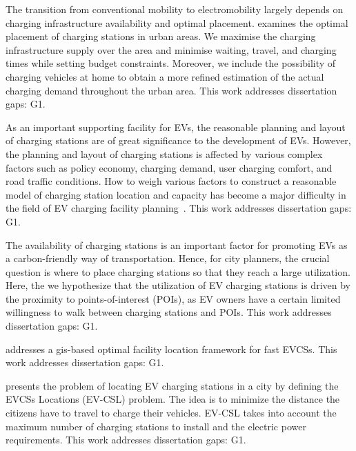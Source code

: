 \documentclass[letterpaper, 12pt, oneside, doublespacing]{Thesis}
\begin{document}
\noindent The transition from conventional mobility to electromobility largely depends on charging infrastructure availability and optimal placement.\cite{reinforcement_learning-based_2022} examines the optimal placement of charging stations in urban areas. We maximise the charging infrastructure supply over the area and minimise waiting, travel, and charging times while setting budget constraints. Moreover, we include the possibility of charging vehicles at home to obtain a more refined estimation of the actual charging demand throughout the urban area. This work addresses dissertation gaps: G1.



\noindent As an important supporting facility for EVs, the reasonable planning and layout of charging stations are of great significance to the development of EVs. However, the planning and layout of charging stations is affected by various complex factors such as policy economy, charging demand, user charging comfort, and road traffic conditions. How to weigh various factors to construct a reasonable model of charging station location and capacity has become a major difficulty in the field of EV charging facility planning~\cite{research_on_2022}. This work addresses dissertation gaps: G1.



\noindent The availability of charging stations is an important factor for promoting EVs as a carbon-friendly way of transportation. Hence, for city planners, the crucial question is where to place charging stations so that they reach a large utilization. Here, the we \cite{web_mining_2022} hypothesize that the utilization of EV charging stations is driven by the proximity to points-of-interest (POIs), as EV owners have a certain limited willingness to walk between charging stations and POIs. This work addresses dissertation gaps: G1.



\noindent \cite{a_gis-based_2021} addresses a gis-based optimal facility location framework for fast EVCSs. This work addresses dissertation gaps: G1.



\noindent \cite{citizen_centric_2021} presents the problem of locating EV charging stations in a city by defining the EVCSs Locations (EV-CSL) problem. The idea is to minimize the distance the citizens have to travel to charge their vehicles. EV-CSL takes into account the maximum number of charging stations to install and the electric power requirements. This work addresses dissertation gaps: G1.
\end{document}
